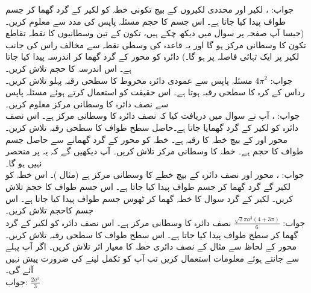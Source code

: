جواب:\quad
{}، 
لکیر  اور محددی لکیروں کے بیچ تکونی خطہ کو لکیر  کے گرد گھما کر جسم طواف پیدا کیا جاتا ہے۔ اس جسم کا حجم مسئلہ پاپس کی مدد سے معلوم کریں۔ (جیسا آپ صفحہ  پر سوال  میں دیکھ چکے ہیں، تکون کے تین وسطانیوں کا نقطہ تقاطع تکون کا وسطانی مرکز ہو گا اور یہ قاعدہ کی وسطی نقطہ  سے مخالف راس کی جانب لکیر پر  ایک تہائی فاصلہ پر ہو گا۔)
دائرہ  کو محور  کے گرد گھما کر اندرسہ پیدا کیا جاتا ہے۔ اس اندرسہ کا حجم تلاش کریں۔\\
جواب:\quad
$4\pi^2$
مسئلہ پاپس  سے عمودی دائرہ مخروط کا سطحی رقبہ پہلو تلاش کریں۔
رداس  کے کرہ کا سطحی رقبہ  ہوتا ہے۔ اس حقیقت کو استعمال کرتے ہوئے مسئلہ پاپس سے نصف دائرہ  کا وسطانی مرکز معلوم کریں۔\\
جواب:\quad
{}،  
آپ نے سوال  میں دریافت کیا کہ نصف دائرہ  کا وسطانی مرکز  ہے۔ اس نصف دائرہ کو لکیر  کے گرد گھمایا جاتا ہے۔حاصل سطح طواف کا سطحی رقبہ تلاش کریں۔
محور  اور  کے بیچ خطہ  کا رقبہ  ہے۔ خطہ  کو محور  کے گرد گھمانے سے حاصل جسم طواف کا حجم  ہے۔ خطہ  کا وسطانی مرکز تلاش کریں۔ آپ دیکھیں گے کہ یہ  پر منحصر نہیں ہو گا۔\\
جواب:\quad
{}، 
محور  اور نصف دائرہ  کے بیچ خطے کا وسطانی مرکز  ہے (مثال )۔ اس خطہ کو لکیر  گے گرد گھما کر جسم طواف پیدا کیا جاتا ہے۔ اس جسم طواف کا حجم تلاش کریں۔
لکیر  کے گرد سوال  کا خطہ گھما کر ٹھوس جسم طواف پیدا کیا جاتا ہے۔ اس جسم کاحجم تلاش کریں۔\\
جواب:\quad
$\tfrac{\sqrt{2}\pi a^3(4+3\pi)}{6}$
نصف دائرہ  کا وسطانی مرکز  ہے۔ اس نصف دائرہ کو لکیر  کے گرد گھما کر سطح طواف پیدا کیا جاتا ہے۔ اس سطح طواف کا سطحی رقبہ تلاش کریں۔
محور  کے لحاظ سے مثال  کے نصف دائری خطہ کا معیار اثر تلاش کریں۔ اگر آپ پہلے سے جانتے ہوئے معلومات استعمال کریں تب آپ کو تکمل لینے کی ضرورت پیش نہیں آئے گی۔\\
جواب:\quad
$\tfrac{2a^3}{3}$
